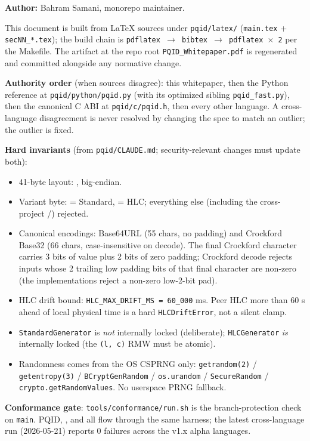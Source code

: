 \textbf{Author:} Bahram Samani, \pqtoolkit{} monorepo maintainer.

This document is built from LaTeX sources under \texttt{pqid/latex/} (\texttt{main.tex} + \texttt{secNN\_*.tex}); the build chain is \texttt{pdflatex $\rightarrow$ bibtex $\rightarrow$ pdflatex $\times$ 2} per the Makefile. The artifact at the repo root \texttt{PQID\_Whitepaper.pdf} is regenerated and committed alongside any normative change.

\textbf{Authority order} (when sources disagree): this whitepaper, then the Python reference at \texttt{pqid/python/pqid.py} (with its optimized sibling \texttt{pqid\_fast.py}), then the canonical C ABI at \texttt{pqid/c/pqid.h}, then every other language. A cross-language disagreement is never resolved by changing the spec to match an outlier; the outlier is fixed.

\textbf{Hard invariants} (from \texttt{pqid/CLAUDE.md}; security-relevant changes must update both):
\begin{itemize}
\item 41-byte layout: , big-endian.
\item Variant byte:  = Standard,  = HLC; everything else (including the cross-project /) rejected.
\item Canonical encodings: Base64URL (55 chars, no padding) and Crockford Base32 (66 chars, case-insensitive on decode). The final Crockford character carries 3 bits of value plus 2 bits of zero padding; Crockford decode rejects inputs whose 2 trailing low padding bits of that final character are non-zero (the implementations reject a non-zero low-2-bit pad).
\item HLC drift bound: \texttt{HLC\_MAX\_DRIFT\_MS = 60\_000} ms. Peer HLC more than 60 s ahead of local physical time is a hard \texttt{HLCDriftError}, not a silent clamp.
\item \texttt{StandardGenerator} is \emph{not} internally locked (deliberate); \texttt{HLCGenerator} \emph{is} internally locked (the \texttt{(l, c)} RMW must be atomic).
\item Randomness comes from the OS CSPRNG only: \texttt{getrandom(2)} / \texttt{getentropy(3)} / \texttt{BCryptGenRandom} / \texttt{os.urandom} / \texttt{SecureRandom} / \texttt{crypto.getRandomValues}. No userspace PRNG fallback.
\end{itemize}

\textbf{Conformance gate}: \texttt{tools/conformance/run.sh} is the branch-protection check on \texttt{main}. PQID, \pqhash{}, and \pqcrypt{} all flow through the same harness; the latest cross-language run (2026-05-21) reports 0 failures across the v1.x alpha languages.
